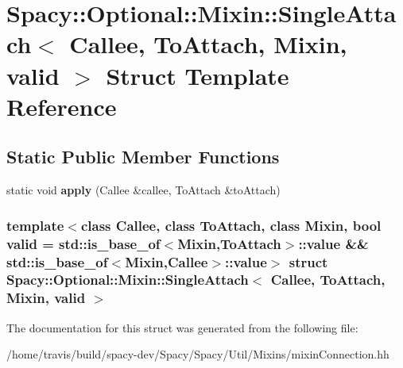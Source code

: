 \hypertarget{structSpacy_1_1Optional_1_1Mixin_1_1SingleAttach}{\section{\-Spacy\-:\-:\-Optional\-:\-:\-Mixin\-:\-:\-Single\-Attach$<$ \-Callee, \-To\-Attach, \-Mixin, valid $>$ \-Struct \-Template \-Reference}
\label{structSpacy_1_1Optional_1_1Mixin_1_1SingleAttach}
}
\subsection*{\-Static \-Public \-Member \-Functions}
\begin{DoxyCompactItemize}
\item 
\hypertarget{structSpacy_1_1Optional_1_1Mixin_1_1SingleAttach_a52061c5546bfd2d59ad15881dda8a01d}{static void {\bfseries apply} (\-Callee \&callee, \-To\-Attach \&to\-Attach)}\label{structSpacy_1_1Optional_1_1Mixin_1_1SingleAttach_a52061c5546bfd2d59ad15881dda8a01d}

\end{DoxyCompactItemize}
\subsubsection*{template$<$class Callee, class To\-Attach, class Mixin, bool valid = std\-::is\-\_\-base\-\_\-of$<$\-Mixin,\-To\-Attach$>$\-::value \&\& std\-::is\-\_\-base\-\_\-of$<$\-Mixin,\-Callee$>$\-::value$>$ struct Spacy\-::\-Optional\-::\-Mixin\-::\-Single\-Attach$<$ Callee, To\-Attach, Mixin, valid $>$}



\-The documentation for this struct was generated from the following file\-:\begin{DoxyCompactItemize}
\item 
/home/travis/build/spacy-\/dev/\-Spacy/\-Spacy/\-Util/\-Mixins/mixin\-Connection.\-hh\end{DoxyCompactItemize}
